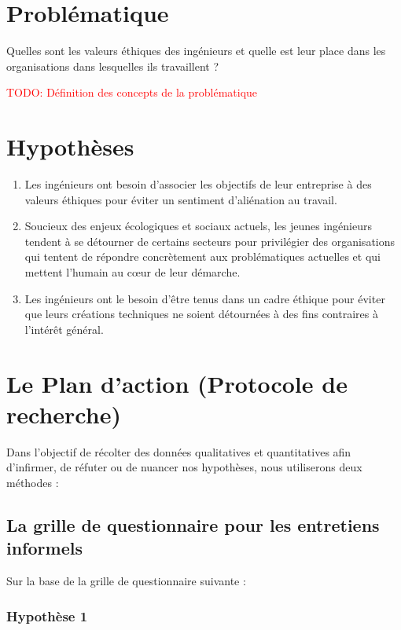 \documentclass[12pt,a4paper]{report}
\begin{document}
\section{Problématique}

Quelles sont les valeurs éthiques des ingénieurs et quelle est leur place dans les organisations dans lesquelles ils travaillent ?

\textcolor{red}{TODO: Définition des concepts de la problématique}

\section{Hypothèses}

\begin{enumerate}
    \item Les ingénieurs ont besoin d'associer les objectifs de leur entreprise à des valeurs éthiques pour éviter un sentiment d'aliénation au travail.
    
    \item Soucieux des enjeux écologiques et sociaux actuels, les jeunes ingénieurs tendent à se détourner de certains secteurs pour privilégier des organisations qui tentent de répondre concrètement aux problématiques actuelles et qui mettent l'humain au cœur de leur démarche.
    
    \item Les ingénieurs ont le besoin d'être tenus dans un cadre éthique pour éviter que leurs créations techniques ne soient détournées à des fins contraires à l'intérêt général.
\end{enumerate}

\section{Le Plan d'action (Protocole de recherche)}

Dans l'objectif de récolter des données qualitatives et quantitatives afin d'infirmer, de réfuter ou de nuancer nos hypothèses, nous utiliserons deux méthodes :

\subsection{La grille de questionnaire pour les entretiens informels}

Sur la base de la grille de questionnaire suivante :

\subsubsection*{Hypothèse 1}
\end{document}
